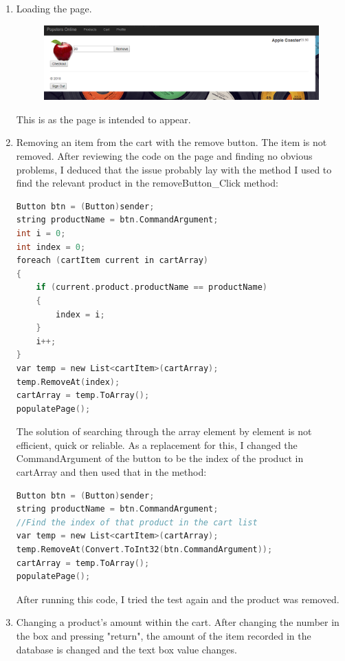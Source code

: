 ﻿\documentclass{article}
\begin{document}
    \begin{enumerate}
        \item Loading the page.
        \begin{figure}[H]
            \includegraphics{testing/cart1.png}
            \centering
        \end{figure}
        This is as the page is intended to appear.
        \item Removing an item from the cart with the remove button.
        The item is not removed.
        After reviewing the code on the page and finding no obvious problems, I deduced that the issue probably lay with the method I used to find the relevant product in the removeButton\_Click method:
        \begin{lstlisting}[language=C]
Button btn = (Button)sender;
string productName = btn.CommandArgument;
int i = 0;
int index = 0;
foreach (cartItem current in cartArray)
{
    if (current.product.productName == productName)
    {
        index = i;
    }
    i++;
}
var temp = new List<cartItem>(cartArray);
temp.RemoveAt(index);
cartArray = temp.ToArray();
populatePage();
        \end{lstlisting}
        The solution of searching through the array element by element is not efficient, quick or reliable.
        As a replacement for this, I changed the CommandArgument of the button to be the index of the product in cartArray and then used that in the method:
        \begin{lstlisting}[language=C]
Button btn = (Button)sender;
string productName = btn.CommandArgument;
//Find the index of that product in the cart list
var temp = new List<cartItem>(cartArray);
temp.RemoveAt(Convert.ToInt32(btn.CommandArgument));
cartArray = temp.ToArray();
populatePage();
        \end{lstlisting}
        After running this code, I tried the test again and the product was removed.
        \item Changing a product's amount within the cart.
        After changing the number in the box and pressing "return", the amount of the item recorded in the database is changed and the text box value changes.

\end{enumerate}
\end{document}
